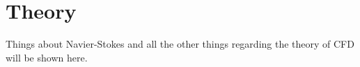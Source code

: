 \section{Theory}
Things about Navier-Stokes and all the other things regarding the theory of CFD will be shown here.